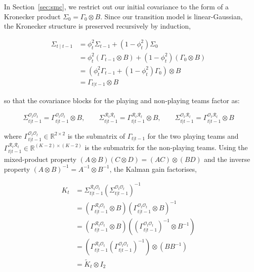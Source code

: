 In Section~\ref{sec:smc}, we restrict out our initial covariance to the form of a Kronecker product $\Sigma_0 = \Gamma_0 \otimes B$. Since our transition model is linear-Gaussian, the Kronecker structure is preserved recursively by induction, 

\begin{align*}
    \Sigma_{t \mid t-1} &= \phi_t^2 \Sigma_{t-1} + (1 - \phi_t^2) \Sigma_0 \\
    &= \phi_t^2 (\Gamma_{t-1} \otimes B) + (1 - \phi_t^2) (\Gamma_0 \otimes B) \\
    &= \left( \phi_t^2 \Gamma_{t-1} + (1 - \phi_t^2) \Gamma_0 \right) \otimes B \\
    &= \Gamma_{t|t-1} \otimes B
\end{align*}

so that the covariance blocks for the playing and non-playing teams factor as:

\begin{equation*}
    \Sigma_{t|t-1}^{\mathcal{O}_t\mathcal{O}_t} = \Gamma^{\mathcal{O}_t\mathcal{O}_t}_{t|t-1} \otimes B, \qquad
    \Sigma_{t|t-1}^{\mathcal{R}_t\mathcal{R}_t} = \Gamma^{\mathcal{R}_t\mathcal{R}_t}_{t|t-1} \otimes B, \qquad
    \Sigma_{t|t-1}^{\mathcal{O}_t\mathcal{R}_t} = \Gamma^{\mathcal{O}_t\mathcal{R}_t}_{t|t-1} \otimes B
\end{equation*}

where $\Gamma^{\mathcal{O}_t\mathcal{O}_t}_{t|t-1} \in \mathbb{R}^{2 \times 2}$ is the submatrix of $\Gamma_{t|t-1}$ for the two playing teams and $\Gamma^{\mathcal{R}_t\mathcal{R}_t}_{t|t-1} \in \mathbb{R}^{(K-2) \times (K-2)}$ is the submatrix for the non-playing teams. Using the mixed-product property $(A \otimes B)(C \otimes D) = (AC) \otimes (BD)$ and the inverse property $(A \otimes B)^{-1} = A^{-1} \otimes B^{-1}$, the Kalman gain factorises,

\begin{align*}
    K_t &= \Sigma_{t|t-1}^{\mathcal{R}_t\mathcal{O}_t} \left( \Sigma_{t|t-1}^{\mathcal{O}_t\mathcal{O}_t} \right)^{-1} \\
    &= \left( \Gamma^{\mathcal{R}_t\mathcal{O}_t}_{t|t-1} \otimes B \right) \left( \Gamma^{\mathcal{O}_t\mathcal{O}_t}_{t|t-1} \otimes B \right)^{-1} \\
    &= \left( \Gamma^{\mathcal{R}_t\mathcal{O}_t}_{t|t-1} \otimes B \right) \left( (\Gamma^{\mathcal{O}_t\mathcal{O}_t}_{t|t-1})^{-1} \otimes B^{-1} \right) \\
    &= \left( \Gamma^{\mathcal{R}_t\mathcal{O}_t}_{t|t-1} (\Gamma^{\mathcal{O}_t\mathcal{O}_t}_{t|t-1})^{-1} \right) \otimes \left( B B^{-1} \right) \\
    &= \tilde{K}_t \otimes I_2
\end{align*}

